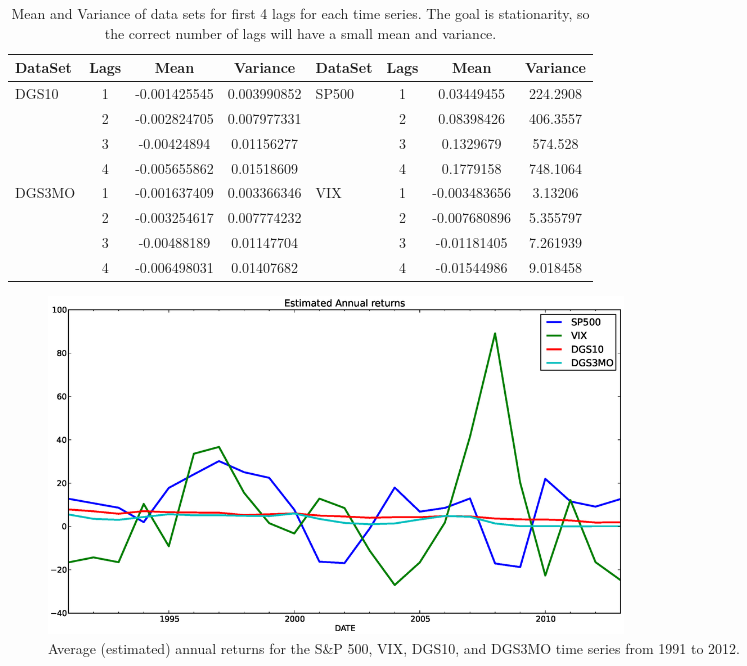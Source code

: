 \documentclass[a4paper, 11pt]{article}
\theoremstyle{definition} %
\numberwithin{equation}{section}
\begin{document}
      \begin{table}
      \begin{centering}
      \begin{tabular}{|l|c|cc||l|c|cc|}
        \hline
         \rowcolor{teal!45} DataSet & Lags &   Mean &     Variance & DataSet & Lags &   Mean &     Variance \\
        \hline
        \hline
         \rowcolor{teal!7} DGS10  & 1    & -0.001425545 &  0.003990852 & SP500  & 1    &   0.03449455 &  224.2908 \\
         \rowcolor{teal!23} {} &     2    & -0.002824705 &  0.007977331 & {} &     2    &   0.08398426 &  406.3557 \\
         \rowcolor{teal!7} {} &     3    &  -0.00424894 &   0.01156277 & {} &      3    &    0.1329679 &   574.528 \\
         \rowcolor{teal!23} {} &     4    & -0.005655862 &   0.01518609 & {} &     4    &    0.1779158 &  748.1064 \\
         \rowcolor{teal!7} DGS3MO &  1    & -0.001637409 &  0.003366346 & VIX    & 1    & -0.003483656 &   3.13206 \\
         \rowcolor{teal!23} {} &     2    & -0.003254617 &  0.007774232 & {} &     2    & -0.007680896 &  5.355797 \\
         \rowcolor{teal!7} {} &     3    &  -0.00488189 &   0.01147704 & {} &     3    &  -0.01181405 &  7.261939 \\
         \rowcolor{teal!23} {} &     4    & -0.006498031 &   0.01407682 & {} &     4    &  -0.01544986 &  9.018458 \\
        \hline
      \end{tabular}
      \captionsetup{width=5.5in}
      \caption{Mean and Variance of data sets for first 4 lags for each time series. The goal is stationarity, so the correct number of lags will have a small mean and variance.}
      \label{tab:differences}
      \end{centering}
      \end{table}

       \begin{figure}[!h]
          \centering
          \includegraphics[width=6in]{./Figures/returns.eps}
          \captionsetup{width=5.5in}
          \caption{\small Average (estimated) annual returns for the S&P 500, VIX, DGS10, and DGS3MO time series from 1991 to 2012.}
          \label{fig:returns}
      \end{figure}
\end{document}
